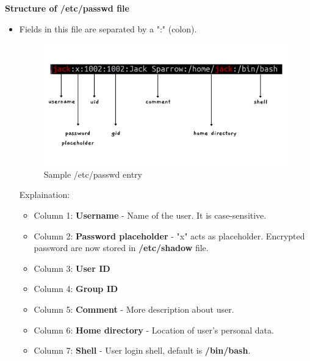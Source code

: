 \begin{flushleft}
\textbf{Structure of /etc/passwd file}
\begin{itemize}
	\item Fields in this file are separated by a ":" (colon).
	\begin{figure}[h!]
	\centering
	\includegraphics[scale=.2]{content/chapter4/images/53.png}
	\caption{Sample /etc/passwd entry}
	\label{fig:user_group1}
	\end{figure}	
	\newline
Explaination:
\begin{itemize}
		
	\item Column 1: \textbf{Username} - Name of the user. It is case-sensitive.
	\item Column 2: \textbf{Password placeholder} - "x" acts as placeholder. Encrypted password are now stored in \textbf{/etc/shadow} file.
	\item Column 3: \textbf{User ID}
	\item Column 4: \textbf{Group ID}
	\item Column 5: \textbf{Comment} - More description about user.
	\item Column 6: \textbf{Home directory} - Location of user's personal data.
	\item Column 7: \textbf{Shell} - User login shell, default is \textbf{/bin/bash}.
\end{itemize}


\end{itemize}	

\newpage


\end{flushleft}
